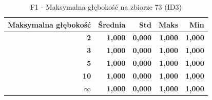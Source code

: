 \begin{table}[htbp]
\centering
\small
\setlength{\tabcolsep}{6pt}
\renewcommand{\arraystretch}{1.2}
\caption{F1 - Maksymalna głębokość na zbiorze 73 (ID3)}
\label{tab:ID3_max_depth_73_f1}
\begin{tabular}{r|r|r|r|r}
\toprule
Maksymalna głębokość & Średnia & Std & Maks & Min \\
\hline
\textbf{2} & \textbf{1,000} & \textbf{0,000} & \textbf{1,000} & \textbf{1,000} \\
\textbf{3} & \textbf{1,000} & \textbf{0,000} & \textbf{1,000} & \textbf{1,000} \\
\textbf{5} & \textbf{1,000} & \textbf{0,000} & \textbf{1,000} & \textbf{1,000} \\
\textbf{10} & \textbf{1,000} & \textbf{0,000} & \textbf{1,000} & \textbf{1,000} \\
\textbf{$\infty$} & \textbf{1,000} & \textbf{0,000} & \textbf{1,000} & \textbf{1,000} \\
\bottomrule
\end{tabular}
\end{table}